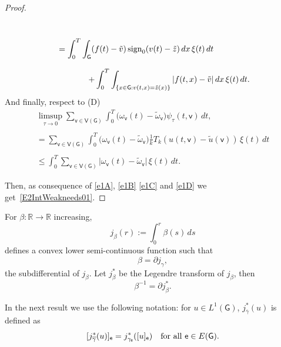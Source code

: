 \documentclass[reqno,12pt]{amsart}
\def\e{\mathsf{e}} 	%
\def\v{\mathsf{v}}	%
\newcommand{\G}{\mathsf{G}}	%
\newcommand{\V}{\mathsf{V}}	%
\numberwithin{equation}{section} %
\begin{document}
\begin{proof}
\begin{equation}
\begin{array}{c}
   \\ \\
     \displaystyle = \int_0^T \int_\G (f(t)- \tilde{v}) \, \hbox{sign}_0 ( v(t)- \tilde z) \,  dx \,  \xi(t)\,dt  \qquad\qquad \\ \\ 
      \displaystyle \qquad\qquad + \int_0^T\int_{\{x\in\G:v(t,x) = \tilde z(x) \}} \vert  f(t,x)- \tilde{v} \vert \, dx\, \xi(t)\,dt.
  \end{array}
 \end{equation}
 And finally, respect to (D)
  \begin{equation}\label{e1D}\begin{array}{c} 
  \displaystyle    \limsup_{\tau\to 0} \sum_{\v\in \V(\G)}\int_0^T\big(\omega_\v(t)-\tilde \omega_\v\big)\psi_\tau(t,\v) \, dt, 
  \\ \\ \displaystyle=  
   \sum_{\v\in \V(\G)}\int_0^T\big(\omega_\v(t)-\tilde \omega_\v\big) \frac{1}{k}T_k(u(t,\v)-\tilde u(\v))\, \xi(t)\,dt\\ \\
    \displaystyle \le \int_0^T \sum_{ \v\in \V(\G)  } \vert   \omega_\v(t)- \tilde{\omega}_\v\vert\, \xi(t)\,dt.
  \end{array}
\end{equation}

  Then, as consequence of \eqref{e1A},  \eqref{e1B}  \eqref{e1C}  and  \eqref{e1D} we get~\eqref{E2IntWeakneeds01}. 
  \end{proof}
 
 For $\beta:\mathbb{R}\to \mathbb{R}$ increasing,
$$j_\beta(r) := \int_0^r \beta(s) \, ds$$  defines a convex lower semi-continuous function such that $$\beta = \partial j_\gamma,$$ the subdifferential of $j_\beta$. Let $j^*_\beta$ be the Legendre transform of $j_\beta$, then $$\beta^{-1} = \partial j^*_\beta.$$
  
In the next result we use the following notation: for $u \in L^{1}(\G)$, $j^*_{\overline{\gamma}}(u)$ is defined as 
 $$[j^*_{\overline{\gamma}}(u)]_\e = j^*_{\gamma_\e}([u]_\e) \quad \hbox{for all} \ \e \in E(\G). $$
\end{document}
